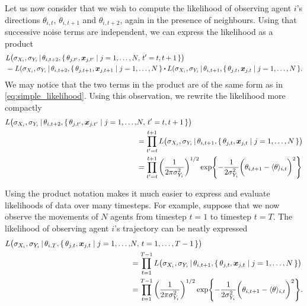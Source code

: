 Let us now consider that we wish to compute the likelihood of observing agent $i$'s directions 
$\theta_{i, t}$, $\theta_{i, t+1}$ and $\theta_{i, t+2}$, again in the presence of neighbours. Using 
that successive noise terms are independent, we can express the likelihood as a product
\begin{align*}
	& L\big(\sigma_{X_i}, \sigma_{Y_i}  \given \theta_{i, t+2},  \{\,\theta_{j, t'}, \bm{x}_{j, t'} \mid 
j=1,\ldots,N, \, t'=t,t+1\,\}\big) \\
									& = L(\sigma_{X_i}, \sigma_{Y_i} \given \theta_{i, t+2}, \{\, \theta_{j, t+1}, \bm{x}_{j, 
t+1} \mid j=1,\ldots,N\,\} \bigcdot L(\sigma_{X_i}, \sigma_{Y_i} \given \theta_{i, t+1}, \{\, 
\theta_{j, t}, \bm{x}_{j, t} \mid j=1,\ldots,N\,\}.
\end{align*}
We may notice that the two terms in the product are of the same form as in 
\cref{eq:simple_likelihood}. Using this observation, we rewrite the likelihood more compactly
\begin{align*}
L\big(\sigma_{X_i}, \sigma_{Y_i}  \,|\, \theta_{i, t+2},  \{\,\theta_{j, t'}, \bm{x}_{j, t'} \mid 
j=1,\ldots,&N, \, t'=t,t+1\,\}\big) \\
& = \prod_{t'=t}^{t+1} L\big(\sigma_{X_i}, \sigma_{Y_i} \,|\, \theta_{i, t+1},  \{\,\theta_{j, t}, 
\bm{x}_{j, t} \mid j=1,\ldots,N\,\}\big) \\
& = \prod_{t'=t}^{t+1} \bigg( \frac{1}{2\pi\sigma_{Y_i}^2} \bigg)^{1/2} 
\exp{-\frac{1}{2\sigma_{Y_i}^2} \bigg(\theta_{i, t+1} - \langle \theta \rangle_{i, t}\bigg)^2 }
\end{align*}

Using the product notation makes it much easier to express and evaluate likelihoods of data over many 
timesteps. For example, suppose that we now observe the movements of $N$ agents from timestep $t=1$ 
to timestep $t=T$. The likelihood of observing agent $i$'s trajectory can be neatly expressed
\begin{align*}
	L\big(\sigma_{X_i}, \sigma_{Y_i}  \,|\, \theta_{i, T},  \{\,\theta_{j, t}, \bm{x}_{j, t} \mid j= 
1,\ldots,&N, \, t=1,  \ldots,T-1\,\}\big) \\
	& = \prod_{t=1}^{T-1} L\big(\sigma_{X_i}, \sigma_{Y_i} \,|\, \theta_{i, t+1},  \{\,\theta_{j, t}, 
\bm{x}_{j, t} \mid j=1,\ldots,N\,\}\big) \\
	& = \prod_{t=1}^{T-1} \bigg( \frac{1}{2\pi\sigma_{Y_i}^2} \bigg)^{1/2} 
\exp{-\frac{1}{2\sigma_{Y_i}^2} \bigg(\theta_{i, t+1} - \langle \theta \rangle_{i, t}\bigg)^2 }.
\end{align*}

